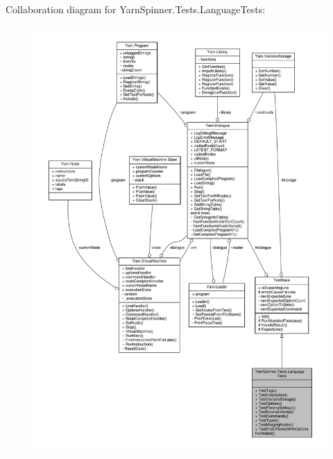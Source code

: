 Collaboration diagram for Yarn\-Spinner.\-Tests.\-Language\-Tests\-:
\nopagebreak
\begin{figure}[H]
\begin{center}
\leavevmode
\includegraphics[width=350pt]{df/df7/a00731}
\end{center}
\end{figure}
